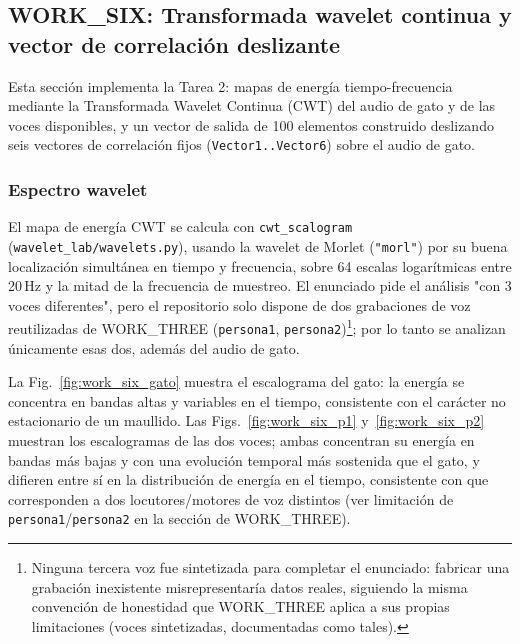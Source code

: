 
\subsection{WORK\_SIX: Transformada wavelet continua y vector de correlación deslizante}

Esta sección implementa la Tarea 2: mapas de energía tiempo-frecuencia mediante la Transformada Wavelet Continua (CWT) del audio de gato y de las voces disponibles, y un vector de salida de 100 elementos construido deslizando seis vectores de correlación fijos (\texttt{Vector1..Vector6}) sobre el audio de gato.

\subsubsection{Espectro wavelet}

El mapa de energía CWT se calcula con \texttt{cwt\_scalogram} (\texttt{wavelet\_lab/wavelets.py}), usando la wavelet de Morlet (\texttt{"morl"}) por su buena localización simultánea en tiempo y frecuencia, sobre 64 escalas logarítmicas entre 20\,Hz y la mitad de la frecuencia de muestreo. El enunciado pide el análisis "con 3 voces diferentes", pero el repositorio solo dispone de dos grabaciones de voz reutilizadas de WORK\_THREE (\texttt{persona1}, \texttt{persona2})\footnote{Ninguna tercera voz fue sintetizada para completar el enunciado: fabricar una grabación inexistente misrepresentaría datos reales, siguiendo la misma convención de honestidad que WORK\_THREE aplica a sus propias limitaciones (voces sintetizadas, documentadas como tales).}; por lo tanto se analizan únicamente esas dos, además del audio de gato.

La Fig.~\ref{fig:work_six_gato} muestra el escalograma del gato: la energía se concentra en bandas altas y variables en el tiempo, consistente con el carácter no estacionario de un maullido. Las Figs.~\ref{fig:work_six_p1} y~\ref{fig:work_six_p2} muestran los escalogramas de las dos voces; ambas concentran su energía en bandas más bajas y con una evolución temporal más sostenida que el gato, y difieren entre sí en la distribución de energía en el tiempo, consistente con que corresponden a dos locutores/motores de voz distintos (ver limitación de \texttt{persona1}/\texttt{persona2} en la sección de WORK\_THREE).

